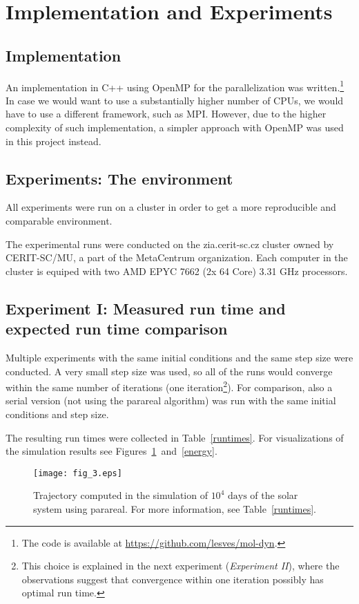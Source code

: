 \documentclass[conference]{IEEEtran}
\begin{document}
\section{Implementation and Experiments}

\subsection{Implementation}
An implementation in C++ using OpenMP for the parallelization was written.\footnote{The code is available at \url{https://github.com/lesves/mol-dyn}.} In case we would want to use a substantially higher number of CPUs, we would have to use a different framework, such as MPI. However, due to the higher complexity of such implementation, a simpler approach with OpenMP was used in this project instead.

\subsection{Experiments: The environment}
All experiments were run on a cluster in order to get a more reproducible and comparable environment. 

The experimental runs were conducted on the zia.cerit-sc.cz cluster owned by CERIT-SC/MU, a part of the MetaCentrum organization. Each computer in the cluster is equiped with two AMD EPYC 7662 (2x 64 Core) 3.31 GHz processors.

\subsection{Experiment I: Measured run time and expected run time comparison}

Multiple experiments with the same initial conditions and the same step size were conducted. A very small step size was used, so all of the runs would converge within the same number of iterations (one iteration\footnote{This choice is explained in the next experiment (\textit{Experiment II}), where the observations suggest that convergence within one iteration possibly has optimal run time.}). For comparison, also a serial version (not using the parareal algorithm) was run with the same initial conditions and step size.

The resulting run times were collected in Table~\ref{runtimes}. For visualizations of the simulation results see Figures~\ref{sim}~and~\ref{energy}.

\begin{figure}[htbp]
\centerline{\texttt{[image: fig\_3.eps]}}
\caption{Trajectory computed in the simulation of $10^4\text{ days}$ of the solar system using parareal. For more information, see Table~\ref{runtimes}.}
\label{sim}
\end{figure}
\end{document}
